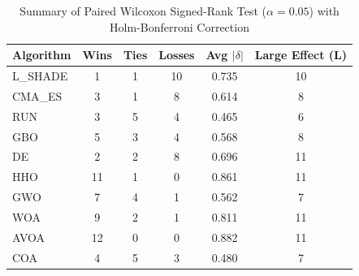 \begin{table}[!t]
\centering\small
\caption{Summary of Paired Wilcoxon Signed-Rank Test ($\alpha=0.05$) with Holm-Bonferroni Correction}
\label{tab:summary_stats}
\begin{tabular}{l|c|c|c|c|c}
\hline
Algorithm & Wins & Ties & Losses & Avg $|\delta|$ & Large Effect (L) \\\hline\hline
L_SHADE & 1 & 1 & 10 & 0.735 & 10 \\\hline
CMA_ES & 3 & 1 & 8 & 0.614 & 8 \\\hline
RUN & 3 & 5 & 4 & 0.465 & 6 \\\hline
GBO & 5 & 3 & 4 & 0.568 & 8 \\\hline
DE & 2 & 2 & 8 & 0.696 & 11 \\\hline
HHO & 11 & 1 & 0 & 0.861 & 11 \\\hline
GWO & 7 & 4 & 1 & 0.562 & 7 \\\hline
WOA & 9 & 2 & 1 & 0.811 & 11 \\\hline
AVOA & 12 & 0 & 0 & 0.882 & 11 \\\hline
COA & 4 & 5 & 3 & 0.480 & 7 \\\hline
\end{tabular}
\end{table}
